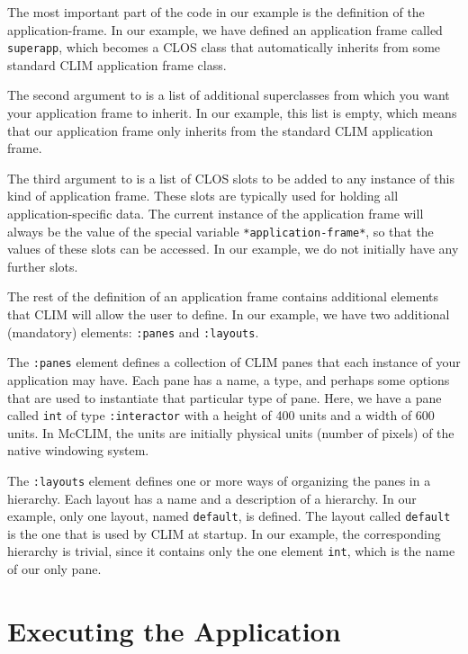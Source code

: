 The most important part of the code in our example is the definition of
the application-frame.  In our example, we have defined an application
frame called \texttt{superapp}, which becomes a CLOS class that automatically
inherits from some standard CLIM application frame class.

The second argument to  is a list of
additional superclasses from which you want your application frame to
inherit.  In our example, this list is empty, which means that our
application frame only inherits from the standard CLIM application
frame.

The third argument to  is a list of
CLOS slots to be added to any instance of this kind of application
frame.  These slots are typically used for holding all
application-specific data.  The current instance of the application
frame will always be the value of the special variable
\texttt{*application-frame*},
so that the values of these slots can be accessed.  In our example, we
do not initially have any further slots.

The rest of the definition of an application frame contains additional
elements that CLIM will allow the user to define.  In our example, we
have two additional (mandatory) elements: \texttt{:panes} and \texttt{:layouts}.

The \texttt{:panes} element defines a collection of CLIM panes that each
instance of your application may have.  Each pane has a name, a type,
and perhaps some options that are used to instantiate that particular
type of pane.  Here, we have a pane called \texttt{int} of type
\texttt{:interactor} with a height of 400 units and a width of 600 units.  In
McCLIM, the units are initially physical units (number of pixels) of the
native windowing system.

The \texttt{:layouts} element defines one or more ways of organizing the
panes in a hierarchy.  Each layout has a name and a description of a
hierarchy.  In our example, only one layout, named \texttt{default}, is
defined.  The layout called \texttt{default} is the one that is used by CLIM
at startup.  In our example, the corresponding hierarchy is trivial,
since it contains only the one element \texttt{int}, which is the name of our
only pane.

\section{Executing the Application}

